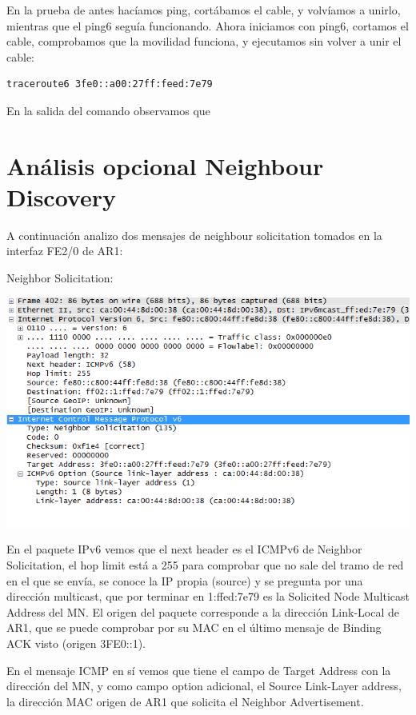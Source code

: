 \documentclass{article}
\begin{document}
En la prueba de antes hacíamos ping, cortábamos el cable, y volvíamos a unirlo, mientras que el ping6 seguía funcionando. Ahora iniciamos con ping6, cortamos el cable, comprobamos que la movilidad funciona, y ejecutamos sin volver a unir el cable:

\begin{BVerbatim}
traceroute6 3fe0::a00:27ff:feed:7e79
\end{BVerbatim}

En la salida del comando observamos que




\section{Análisis opcional Neighbour Discovery}
A continuación analizo dos mensajes de neighbour solicitation tomados en la interfaz FE2/0 de AR1:

Neighbor Solicitation:

\begin{center} 
	\includegraphics[scale=0.8]{images/neighSol.png}
\end{center}

En el paquete IPv6 vemos que el next header es el ICMPv6 de Neighbor Solicitation, el hop limit está a 255 para comprobar que no sale del tramo de red en el que se envía, se conoce la IP propia (source) y se pregunta por una dirección multicast, que por terminar en 1:ffed:7e79 es la Solicited Node Multicast Address del MN. El origen del paquete corresponde a la dirección Link-Local de AR1, que se puede comprobar por su MAC en el último mensaje de Binding ACK visto (origen 3FE0::1).

En el mensaje ICMP en sí vemos que tiene el campo de Target Address con la dirección del MN, y como campo option adicional, el Source Link-Layer address, la dirección MAC origen de AR1 que solicita el Neighbor Advertisement.
\end{document}
